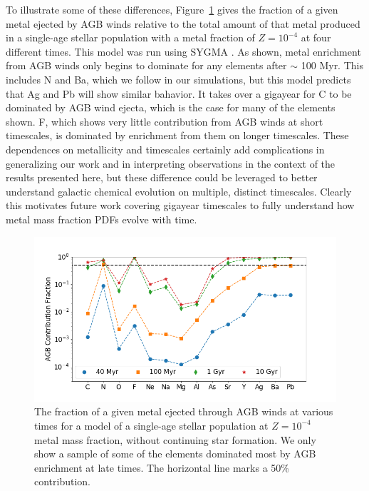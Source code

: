\documentclass[twocolumn]{aastex61}
\begin{document}
To illustrate some of these differences, Figure~\ref{fig:agb evolution} gives the fraction of a given metal ejected by AGB winds relative to the total amount of that metal produced in a single-age stellar population with a metal fraction of $Z = 10^{-4}$ at four different times. This model was run using \textsc{SYGMA} \citep{Ritter2017}. As shown, metal enrichment from AGB winds only begins to dominate for
    any elements after 
$\sim$ 100 Myr. This includes N and Ba, which we follow in our simulations, but this 
    model predicts 
that Ag and Pb 
     will
show similar bahavior. It takes over a gigayear for C to be dominated by AGB wind ejecta, which is the case for many of the elements shown. F, which shows very little contribution from AGB winds at short timescales, is dominated by enrichment from them on longer timescales. These dependences on metallicity and timescales certainly add complications in generalizing our work and in interpreting observations in the context of the results presented here, but these difference could be leveraged to better understand galactic chemical evolution on multiple, distinct timescales. Clearly this motivates future work covering gigayear timescales to fully understand how metal mass fraction PDFs evolve with time.

\begin{figure}
\centering
\includegraphics[width=0.95\linewidth]{Half_AGB_Fraction_elements_s0.png}
\caption{The fraction of a given metal ejected through AGB winds at various times for a model of a single-age stellar population at $Z = 10^{-4}$ metal mass fraction, without continuing star formation. We only show a sample of some of the elements dominated most by AGB enrichment at late times. The horizontal line marks a 50\% contribution.}
\label{fig:agb evolution}
\end{figure}
\end{document}
